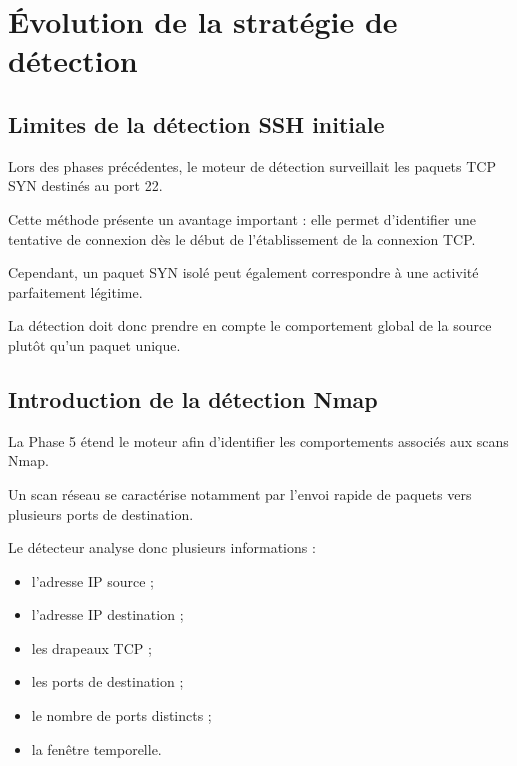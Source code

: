 \section{Évolution de la stratégie de détection}

\subsection{Limites de la détection SSH initiale}

Lors des phases précédentes, le moteur de détection surveillait les paquets TCP SYN destinés au port 22.

Cette méthode présente un avantage important : elle permet d'identifier une tentative de connexion dès le début de l'établissement de la connexion TCP.

Cependant, un paquet SYN isolé peut également correspondre à une activité parfaitement légitime.

La détection doit donc prendre en compte le comportement global de la source plutôt qu'un paquet unique.

\subsection{Introduction de la détection Nmap}

La Phase 5 étend le moteur afin d'identifier les comportements associés aux scans Nmap.

Un scan réseau se caractérise notamment par l'envoi rapide de paquets vers plusieurs ports de destination.

Le détecteur analyse donc plusieurs informations :

\begin{itemize}

\item l'adresse IP source ;

\item l'adresse IP destination ;

\item les drapeaux TCP ;

\item les ports de destination ;

\item le nombre de ports distincts ;

\item la fenêtre temporelle.

\end{itemize}

